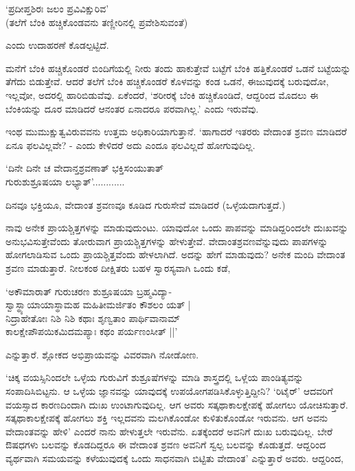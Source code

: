 \begin{shloka}
`ಪ್ರದೀಪ್ತಶಿರಃ ಜಲಂ ಪ್ರವಿವಿಕ್ಷುರಿವ'\\
(ತಲೆಗೆ ಬೆಂಕಿ ಹಚ್ಚಿಕೊಂಡವನು ತಣ್ಣೀರಿನಲ್ಲಿ ಪ್ರವೇಶಿಸುವಂತೆ)
\end{shloka}

ಎಂದು ಉದಾಹರಣೆ ಕೊಡಲ್ಪಟ್ಟಿದೆ.

ಮನೆಗೆ ಬೆಂಕಿ ಹಚ್ಚಿಕೊಂಡರೆ ಬಿಂದಿಗೆಯಲ್ಲಿ ನೀರು ತಂದು ಹಾಕುತ್ತೇವೆ ಬಟ್ಟೆಗೆ ಬೆಂಕಿ ಹತ್ತಿಕೊಂಡರೆ ಒಡನೆ ಬಟ್ಟೆಯನ್ನು ತೆಗೆದು ಬಿಡುತ್ತೇವೆ. ಆದರೆ ತಲೆಗೆ ಬೆಂಕಿ ಹಚ್ಚಿಕೊಂಡರೆ ಕೊಳವನ್ನು ಕಂಡ ಒಡನೆ, ಈಜುವುದಕ್ಕೆ ಬರುವುದೋ, ಇಲ್ಲವೋ, ಅದರಲ್ಲಿ ಹಾರಿಬಿಡುವೆವು. ಏಕೆಂದರೆ, `ಶರೀರಕ್ಕೆ ಬೆಂಕಿ ಹಚ್ಚಿಕೊಂಡಿದೆ, ಆದ್ದರಿಂದ ಮೊದಲು ಈ ಬೆಂಕಿಯನ್ನು ದೂರ ಮಾಡಿದರೆ ಆನಂತರ ಏನಾದರೂ ಪರವಾಗಿಲ್ಲ.' ಎಂದು ಇರುವೆವು.

ಇಂಥ ಮುಮುಕ್ಷುತ್ವವಿರುವವನು ಉತ್ತಮ ಅಧಿಕಾರಿಯಾಗುತ್ತಾನೆ. `ಹಾಗಾದರೆ ಇತರರು ವೇದಾಂತ ಶ್ರವಣ ಮಾಡಿದರೆ ಏನೂ ಫಲವಿಲ್ಲವೇ? - ಎಂದು ಕೇಳಿದರೆ ಅದು ಎಂದೂ ಫಲವಿಲ್ಲದೆ ಹೋಗುವುದಿಲ್ಲ.

\begin{shloka}
`ದಿನೇ ದಿನೇ ಚ ವೇದಾನ್ತಶ್ರವಣಾತ್ ಭಕ್ತಿಸಂಯುತಾತ್\\
ಗುರುಶುಶ್ರೂಷಯಾ ಲಭ್ಯಾತ್'............
\end{shloka}

ದಿನವೂ ಭಕ್ತಿಯೂ, ವೇದಾಂತ ಶ್ರವಣವೂ ಕೂಡಿದ ಗುರುಸೇವೆ ಮಾಡಿದರೆ (ಒಳ್ಳೆಯದಾಗುತ್ತದೆ.)

ನಾವು ಅನೇಕ ಪ್ರಾಯಶ್ಚಿತ್ತಗಳನ್ನು ಮಾಡುವುದುಂಟು. ಯಾವುದೋ ಒಂದು ಪಾಪವನ್ನು ಮಾಡಿದ್ದರಿಂದಲೇ ದುಃಖವನ್ನು ಅನುಭವಿಸುತ್ತೇವೆಂದು ತೋರುವಾಗ ಪ್ರಾಯಶ್ಚಿತ್ತಗಳನ್ನು ಹೇಳುತ್ತೇವೆ. ವೇದಾಂತಶ್ರವಣವೆನ್ನುವುದು ಪಾಪಗಳನ್ನು ಹೋಗಲಾಡಿಸುವ ಒಂದು ಪ್ರಾಯಶ್ಚಿತ್ತವೆಂದು ಹೇಳಲಾಗಿದೆ. ಅದನ್ನು ಹೇಗೆ ಮಾಡುವುದು? ಅನೇಕ ಮಂದಿ ವೇದಾಂತ ಶ್ರವಣ ಮಾಡುತ್ತಾರೆ. ನೀಲಕಂಠ ದೀಕ್ಷಿತರು ಬಹಳ ಸ್ವಾರಸ್ಯವಾಗಿ ಒಂದು ಕಡೆ,

\begin{shloka}
`ಅಕೌಮಾರಾತ್ ಗುರುಚರಣ ಶುಶ್ರೂಷಯಾ ಬ್ರಹ್ಮವಿದ್ಯಾ-\\
ಸ್ವಾಸ್ಥ್ಯಾಯಾಯಾಸ್ಥಾಮಹ ಮಹಿತೀಮರ್ಜಿತಂ ಕೌಶಲಂ ಯತ್ |\\
ನಿದ್ರಾಹೇತೋಃ ನಿಶಿ ನಿಶಿ ಕಥಾಃ ಶೃಣ್ವತಾಂ ಪಾರ್ಥಿವಾನಾಮ್\\
ಕಾಲಕ್ಷೇಪೌಪಯಿಕಮಿದಮಪ್ಯಾಃ ಕಥಂ ಪರ್ಯಣಂಸೀತ್ ||'
\end{shloka}

ಎನ್ನುತ್ತಾರೆ. ಶ್ಲೋಕದ ಅಭಿಪ್ರಾಯವನ್ನು ವಿವರವಾಗಿ ನೋಡೋಣ.

`ಚಿಕ್ಕ ವಯಸ್ಸಿನಿಂದಲೇ ಒಳ್ಳೆಯ ಗುರುವಿಗೆ ಶುಶ್ರೂಷೆಗಳನ್ನು ಮಾಡಿ ಶಾಸ್ತ್ರದಲ್ಲಿ ಒಳ್ಲೆಯ ಪಾಂಡಿತ್ಯವನ್ನು ಸಂಪಾದಿಸಿಬಿಟ್ಟನು. ಆ ಒಳ್ಳೆಯ ಜ್ಞಾನವನ್ನು ಯಾವುದಕ್ಕೆ ಉಪಯೋಗಪಡಿಸಿಕೊಳ್ಳುತ್ತಿದ್ದೀನಿ? `ರಿಟೈರ್' ಆದವರಿಗೆ ವಯಸ್ಸಾದ ಕಾರಣದಿಂದಾಗಿ ದುಃಖ ಉಂಟಾಗುವುದಿಲ್ಲ. ಆಗ ಅವರು ಸತ್ಕಥಾಕಾಲಕ್ಷೇಪಕ್ಕೆ ಹೋಗಲು ಯೋಚಿಸುತ್ತಾರೆ. ಸತ್ಕಥಾಕಾಲಕ್ಷೇಪಕ್ಕೆ ಹೋಗಲು ಶಕ್ತಿ ಇಲ್ಲದವನು ಮಲಗಿಕೊಂಡೋ ಕುಳಿತುಕೊಂಡೋ ಇರುವನು. ಆಗ ಅವನು ವೇದಾಂತವನ್ನು ಹೇಳಿ' ಎಂದರೆ ನಾನು ಹೇಳುತ್ತಲೇ ಇರುವೆನು. ಏತಕ್ಕೆಂದರೆ ಅವನಿಗೆ ದುಃಖ ಬರುವುದಿಲ್ಲ. ಬೇರೆ ಔಷಧಗಳು ಬಲವನ್ನು ಕೊಡದಿದ್ದರೂ ಈ ವೇದಾಂತ ಶ್ರವಣ ಅವನಿಗೆ ಸ್ವಲ್ಪ ಬಲವನ್ನು ಕೊಡುತ್ತದೆ. ಆದ್ದರಿಂದ ವ್ಯರ್ಥವಾಗಿ ಸಮಯವನ್ನು ಕಳೆಯುವುದಕ್ಕೆ ಒಂದು ಸಾಧನವಾಗಿ ಬಿಟ್ಟಿತು ವೇದಾಂತ' ಎನ್ನುತ್ತಾರೆ ಅವರು. ಆದ್ದರಿಂದ,

